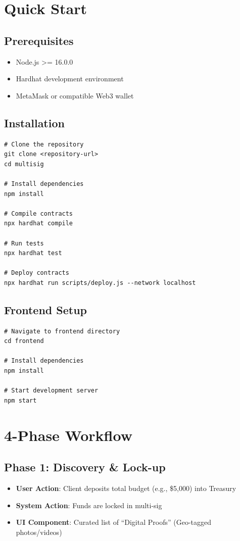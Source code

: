 \documentclass[12pt,a4paper]{article}
\begin{document}
\section{Quick Start}

\subsection{Prerequisites}
\begin{itemize}
\item Node.js >= 16.0.0
\item Hardhat development environment
\item MetaMask or compatible Web3 wallet
\end{itemize}

\subsection{Installation}
\begin{verbatim}
# Clone the repository
git clone <repository-url>
cd multisig

# Install dependencies
npm install

# Compile contracts
npx hardhat compile

# Run tests
npx hardhat test

# Deploy contracts
npx hardhat run scripts/deploy.js --network localhost
\end{verbatim}

\subsection{Frontend Setup}
\begin{verbatim}
# Navigate to frontend directory
cd frontend

# Install dependencies
npm install

# Start development server
npm start
\end{verbatim}

\section{4-Phase Workflow}

\subsection{Phase 1: Discovery \& Lock-up}
\begin{itemize}
\item \textbf{User Action}: Client deposits total budget (e.g., \$5,000) into Treasury
\item \textbf{System Action}: Funds are locked in multi-sig
\item \textbf{UI Component}: Curated list of ``Digital Proofs'' (Geo-tagged photos/videos)
\end{itemize}
\end{document}
